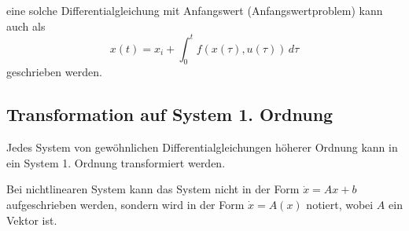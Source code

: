         eine solche Differentialgleichung mit Anfangswert (Anfangswertproblem) kann auch als
        \begin{equation*}
	        x(t) = x _ i + \int_{0}^{t} \! f(x(\tau), u(\tau)) \, d\!\tau
        \end{equation*}
        geschrieben werden.
    
        \subsection{Transformation auf System 1. Ordnung} %
            Jedes System von gewöhnlichen Differentialgleichungen höherer Ordnung kann in ein System 1. Ordnung transformiert werden.
            
            Bei nichtlinearen System kann das System nicht in der Form \( \dot{x} = Ax + b \) aufgeschrieben werden, sondern wird in der Form \( \dot{x} = A(x) \) notiert, wobei \( A \) ein Vektor ist.
            
